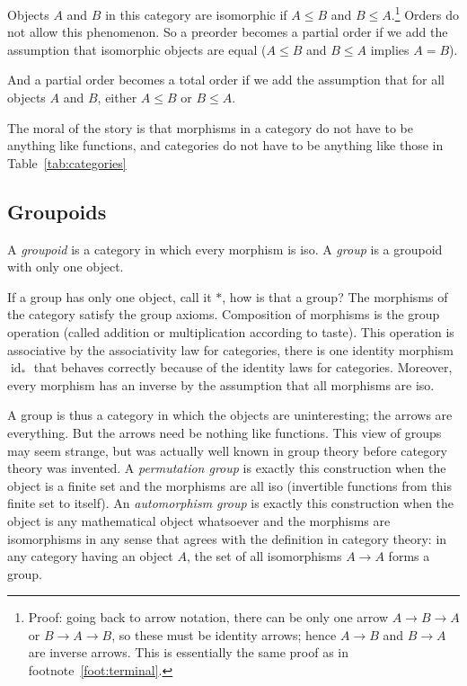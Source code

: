 \documentclass[11pt]{article}
\DeclareMathOperator{\idfun}{id}
\begin{document}
Objects $A$ and $B$ in this category are isomorphic
if $A \le B$ and $B \le A$.\footnote{Proof: going back to arrow notation,
there can be only one arrow
$A \to B \to A$ or $B \to A \to B$, so these must be identity arrows;
hence $A \to B$ and $B \to A$ are inverse arrows.
This is essentially the same proof as in footnote~\ref{foot:terminal}.}
Orders do not allow this phenomenon.  So a preorder becomes a partial order if
we add the assumption that isomorphic objects are equal
($A \le B$ and $B \le A$ implies $A = B$).

And a partial order becomes a total order if we add the assumption that
for all objects $A$ and $B$, either $A \le B$ or $B \le A$.

The moral of the story is that morphisms in a category do not have to
be anything like functions, and categories do not have to be anything
like those in Table~\ref{tab:categories}

\subsection{Groupoids}
\label{sec:groupoid}

A \emph{groupoid} is a category in which every morphism is iso.
A \emph{group} is a groupoid with only one object.

If a group has only one object, call it $*$, how is that a group?
The morphisms of the category satisfy the group axioms.
Composition of morphisms is the group operation (called addition or
multiplication according to taste).  This operation is associative
by the associativity law for categories,
there is one identity morphism $\idfun_{\textstyle *}$
that behaves correctly because of the identity laws for categories.
Moreover, every morphism has an inverse by the assumption that all
morphisms are iso.

A group is thus a category in which the objects are uninteresting;
the arrows are everything.  But the arrows need be nothing like functions.
This view of groups may seem strange, but was actually well known in
group theory before category theory was invented.
A \emph{permutation group} is exactly this construction when the object
is a finite set and the morphisms are all iso (invertible functions
from this finite set to itself).
An \emph{automorphism group} is exactly this construction when the object
is any mathematical object whatsoever and the morphisms are isomorphisms
in any sense that agrees with the definition in category theory:
in any category having an object $A$, the set of all isomorphisms $A \to A$
forms a group.
\end{document}
